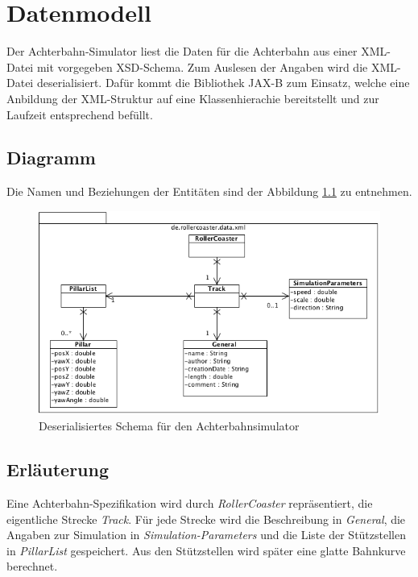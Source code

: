\chapter{Datenmodell}
Der Achterbahn-Simulator liest die Daten für die Achterbahn aus einer XML-Datei
mit vorgegeben XSD-Schema. Zum Auslesen der Angaben wird die XML-Datei deserialisiert.
Dafür kommt die Bibliothek JAX-B zum Einsatz, welche eine Anbildung der XML-Struktur
auf eine Klassenhierachie bereitstellt und zur Laufzeit entsprechend befüllt.

\section{Diagramm}
Die Namen und Beziehungen der Entitäten sind der Abbildung \ref{fig:xml} zu entnehmen.

\begin{figure}
\includegraphics[width=\linewidth]{bilder/XML.png}
\caption{Deserialisiertes Schema für den Achterbahnsimulator}
\label{fig:xml}
\end{figure}

\section{Erläuterung}
Eine Achterbahn-Spezifikation wird durch \emph{RollerCoaster}
repräsentiert, die eigentliche Strecke \emph{Track}. Für jede Strecke
wird die Beschreibung in \emph{General}, die Angaben zur Simulation
in \emph{Simulation-Parameters} und die Liste der Stützstellen 
in \emph{PillarList} gespeichert. Aus den Stützstellen wird später eine
glatte Bahnkurve berechnet.

